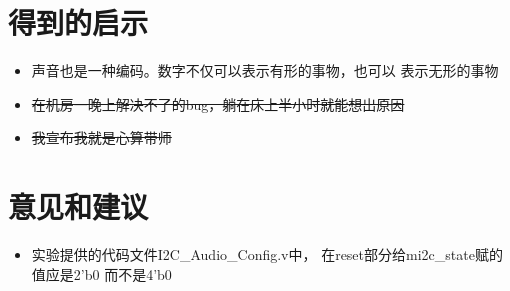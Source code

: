 \documentclass[12pt,a4paper,UTF8]{article}
\begin{document}
\section{得到的启示}
\begin{itemize}
  \item 声音也是一种编码。数字不仅可以表示有形的事物，也可以
        表示无形的事物
  \item \sout{在机房一晚上解决不了的bug，躺在床上半小时就能想出原因}
  \item \sout{我宣布我就是心算带师}
\end{itemize}

\section{意见和建议}
\begin{itemize}
  \item 实验提供的代码文件\mbox{I2C\_Audio\_Config.v}中，
        在reset部分给\mbox{mi2c\_state}赋的值应是\mbox{2'b0}
        而不是\mbox{4'b0}
\end{itemize}
\end{document}
